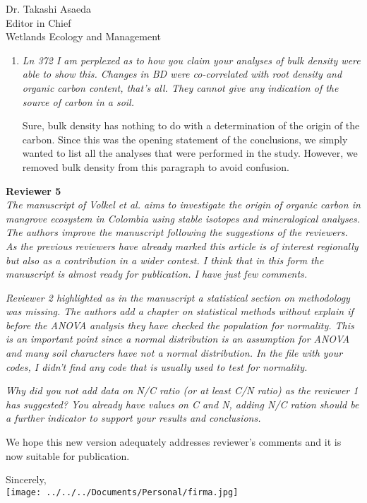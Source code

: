 \documentclass[11pt]{bgcletter}
\begin{document}
\begin{letter}{Dr. Takashi Asaeda\\
 Editor in Chief \\ Wetlands Ecology and Management}
\begin{enumerate}
{\color{blue} The sentence was completed to make the contrast clear as suggested.}

\item {\it Ln 372 I am perplexed as to how you claim your analyses of bulk density were able to show this. Changes in BD were co-correlated with root density and organic carbon content, that's all. They cannot give any indication of the source of carbon in a soil.}

{\color{blue} Sure, bulk density has nothing to do with a determination of the origin of the carbon. Since this was the opening statement of the conclusions, we simply wanted to list all the analyses that were performed in the study. However, we removed bulk density from this paragraph to avoid confusion.}

\end{enumerate}

\newpage
{\bf Reviewer 5} \\

{\it The manuscript of Volkel et al. aims to investigate the origin of organic carbon in mangrove ecosystem in Colombia using stable isotopes and mineralogical analyses. The authors improve the manuscript following the suggestions of the reviewers. As the previous reviewers have already marked this article is of interest regionally but also as a contribution in a wider contest. I think that in this form the manuscript is almost ready for publication. I have just few comments.}

{\it Reviewer 2 highlighted as in the manuscript a statistical section on methodology was missing. The authors add a chapter on statistical methods without explain if before the ANOVA analysis they have checked the population for normality. This is an important point since a normal distribution is an assumption for ANOVA and many soil characters have not a normal distribution. In the file with your codes, I didn't find any code that is usually used to test for normality.}

{\it Why did you not add data on N/C ratio (or at least C/N ratio) as the reviewer 1 has suggested? You already have values on C and N, adding N/C ration should be a further indicator to support your results and conclusions.}

\vspace{2em}
We hope this new version adequately addresses reviewer's comments and it is now suitable for publication.

\closing{Sincerely, \\
 \texttt{[image: ../../../Documents/Personal/firma.jpg]}
 }
 \end{letter}

 
\end{document}
